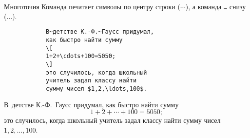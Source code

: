 \begin{frame}[fragile]{Многоточия}
	Команда \texttt{\cdots} печатает символы по центру строки ($\cdots$), а команда \texttt{\ldots} снизу ($\ldots$).
	
	\begin{minipage}{0.59\textwidth}
		\begin{verbatim}
			В~детстве К.-Ф.~Гаусс придумал,
			как быстро найти сумму
			\[
			1+2+\cdots+100=5050;
			\]
			это случилось, когда школьный
			учитель задал классу найти
			сумму чисел $1,2,\ldots,100$.
		\end{verbatim}
	\end{minipage}
	\begin{minipage}{0.39\textwidth}
		В~детстве К.-Ф.~Гаусс придумал,
		как быстро найти сумму
		$$
		1+2+\cdots+100=5050;
		$$
		это случилось, когда школьный
		учитель задал классу найти
		сумму чисел $1,2,\ldots,100$.
	\end{minipage}
	
\end{frame}


